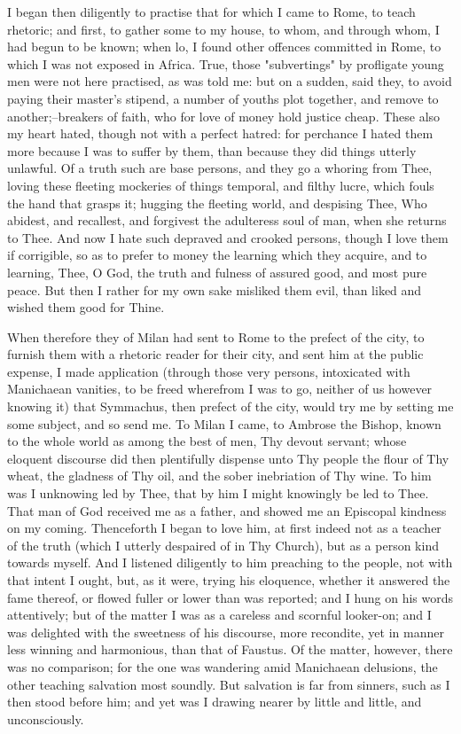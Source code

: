 \documentclass[b5paper,openright,12pt,twoside]{book}
\begin{document}
I began then diligently to practise that for which I came to Rome, to
teach rhetoric; and first, to gather some to my house, to whom, and
through whom, I had begun to be known; when lo, I found other offences
committed in Rome, to which I was not exposed in Africa. True, those
"subvertings" by profligate young men were not here practised, as was
told me: but on a sudden, said they, to avoid paying their
master's stipend, a number of youths plot together, and remove to
another;--breakers of faith, who for love of money hold justice cheap.
These also my heart hated, though not with a perfect hatred: for
perchance I hated them more because I was to suffer by them, than
because they did things utterly unlawful. Of a truth such are base
persons, and they go a whoring from Thee, loving these fleeting
mockeries of things temporal, and filthy lucre, which fouls the hand
that grasps it; hugging the fleeting world, and despising Thee, Who
abidest, and recallest, and forgivest the adulteress soul of man, when
she returns to Thee. And now I hate such depraved and crooked persons,
though I love them if corrigible, so as to prefer to money the learning
which they acquire, and to learning, Thee, O God, the truth and fulness
of assured good, and most pure peace. But then I rather for my own sake
misliked them evil, than liked and wished them good for Thine.

When therefore they of Milan had sent to Rome to the prefect of the
city, to furnish them with a rhetoric reader for their city, and sent
him at the public expense, I made application (through those very
persons, intoxicated with Manichaean vanities, to be freed wherefrom
I was to go, neither of us however knowing it) that Symmachus, then
prefect of the city, would try me by setting me some subject, and so
send me. To Milan I came, to Ambrose the Bishop, known to the whole
world as among the best of men, Thy devout servant; whose eloquent
discourse did then plentifully dispense unto Thy people the flour of Thy
wheat, the gladness of Thy oil, and the sober inebriation of Thy wine.
To him was I unknowing led by Thee, that by him I might knowingly be
led to Thee. That man of God received me as a father, and showed me an
Episcopal kindness on my coming. Thenceforth I began to love him, at
first indeed not as a teacher of the truth (which I utterly despaired
of in Thy Church), but as a person kind towards myself. And I listened
diligently to him preaching to the people, not with that intent I ought,
but, as it were, trying his eloquence, whether it answered the fame
thereof, or flowed fuller or lower than was reported; and I hung on his
words attentively; but of the matter I was as a careless and scornful
looker-on; and I was delighted with the sweetness of his discourse,
more recondite, yet in manner less winning and harmonious, than that of
Faustus. Of the matter, however, there was no comparison; for the one
was wandering amid Manichaean delusions, the other teaching salvation
most soundly. But salvation is far from sinners, such as I then stood
before him; and yet was I drawing nearer by little and little, and
unconsciously.
\end{document}
